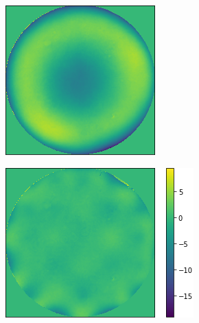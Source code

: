 \begin{figure}[h]
	\centering
	\begin{subfigure}{0.33\textwidth}
		\centering
		\includegraphics[scale=2]{./images/system_wavefront_before_correction_adv.png}
		\caption{}
		\label{fig:aberrated_wavefront_defocus_ptt_rmv_crop_phase_only}
	\end{subfigure}
	\begin{subfigure}{0.425\textwidth}
		\centering
		\includegraphics[scale=2]{./images/system_wavefront_after_correction_best_20it_adv.png}
		\caption{}
		\label{fig:flattened_wavefront_20it}
	\end{subfigure}
	

\end{figure}
